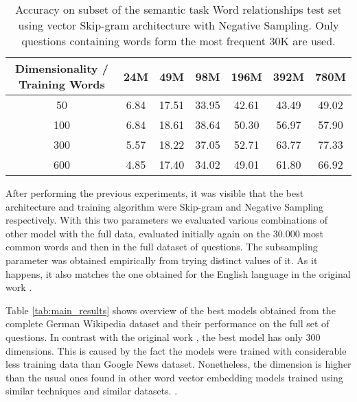 \begin{table}[h]
\centering
\caption{Accuracy on subset of the semantic task Word relationships test set using
vector Skip-gram architecture with Negative Sampling. Only questions containing words form the most
 frequent 30K are used. } 
\label{tab:initial_w2v_training}

\small
\begin{tabular}{|c|cccccc|}
\hline
 Dimensionality / Training Words  &   24M  &    49M  &    98M  &   196M  &   392M  &   780M  \\
\hline
                              50  &  6.84  &  17.51  &  33.95  &  42.61  &  43.49  &  49.02  \\
                             100  &  6.84  &  18.61  &  38.64  &  50.30  &  56.97  &  57.90  \\
                             300  &  5.57  &  18.22  &  37.05  &  52.71  &  63.77  &  77.33  \\
                             600  &  4.85  &  17.40  &  34.02  &  49.01  &
                             61.80  &  66.92  \\
\hline
\end{tabular}
\end{table}


After performing the previous experiments, it was visible that the best
architecture and training algorithm were Skip-gram and Negative Sampling
respectively. With this two parameters we evaluated various combinations of
other model with the full data, evaluated initially again on the 30.000 most
common words  and then in the full dataset of questions. The subsampling
parameter was obtained empirically from trying distinct values of it. As it
happens, it also matches the one obtained for the English language in the
original work \cite{DBLP:journals/corr/abs-1301-3781}.

Table \ref{tab:main_results} shows  overview of the best models obtained from
the complete German Wikipedia dataset  and their performance on the full set
of questions. In contrast with the original work
\cite{MikolovSCCD13} \cite{DBLP:journals/corr/abs-1301-3781}, the best model
has only 300 dimensions. This is caused by the fact the models were trained
with considerable less training data than Google News dataset. Nonetheless,
the dimension is higher than the usual ones found in other word vector embedding models
trained using similar techniques and similar datasets.\cite{Turian:2010:WRS:1858681.1858721} \cite{DBLP:journals/corr/abs-1103-0398}.

